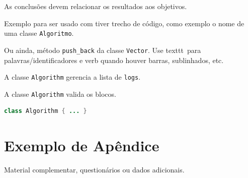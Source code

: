 \documentclass[12pt,oneside]{article}
\newcommand{\code}[1]{\texttt{#1}}
\begin{document}
As conclusões devem relacionar os resultados aos objetivos. 

Exemplo para ser usado com tiver trecho de código, como exemplo o nome de uma
classe \texttt{Algoritmo}.

Ou ainda, método \verb|push_back| da classe \texttt{Vector}. Use texttt\ para
palavras/identificadores e verb quando houver barras, sublinhados, etc.

A classe \code{Algorithm} gerencia a lista de \code{logs}.

A classe \lstinline!Algorithm! valida os blocos.

\begin{lstlisting}[language=Java, caption={Exemplo de classe}, label={lst:ex}]
class Algorithm { ... }
\end{lstlisting}

\printbibliography

\appendix
\renewcommand{\thesection}{Apêndice \Alph{section}}

\section{Exemplo de Apêndice}
Material complementar, questionários ou dados adicionais.
\end{document}
